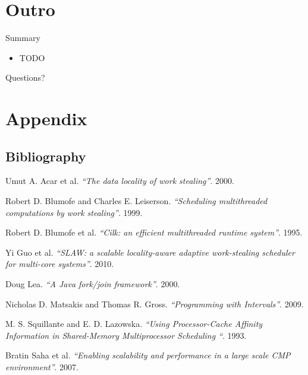 \note{
}


\section*{Outro}

\begin{frame}{Summary}
  \begin{itemize}
  \item TODO
  \end{itemize}
\end{frame}

\note{
}

\begin{frame}
  \begin{center}
    \huge Questions?
  \end{center}
\end{frame}

\note{
}


\appendix

\section{Appendix}

\subsection{Bibliography}

\begin{frame}
  \begin{thebibliography}{10}
    \beamertemplatearticlebibitems

   Umut A. Acar et al. {\em``The data locality
      of work stealing''}. 2000.

   Robert D. Blumofe and Charles
    E. Leiserson. {\em``Scheduling multithreaded computations by work
      stealing''}. 1999.

   Robert D. Blumofe et al. {\em``Cilk: an efficient
      multithreaded runtime system''}. 1995.

   Yi Guo et al. {\em``SLAW: a scalable locality-aware
      adaptive work-stealing scheduler for multi-core
      systems''}. 2010.

   Doug Lea. {\em``A Java fork/join
      framework''}. 2000.

   Nicholas D. Matsakis and Thomas
    R. Gross. {\em``Programming with Intervals''}. 2009.

   M. S. Squillante and
    E. D. Lazowska. {\em``Using Processor-Cache Affinity Information
      in Shared-Memory Multiprocessor Scheduling ``}. 1993.

   Bratin Saha et al. {\em``Enabling scalability and
      performance in a large scale CMP environment''}. 2007.

  \end{thebibliography}
\end{frame}


